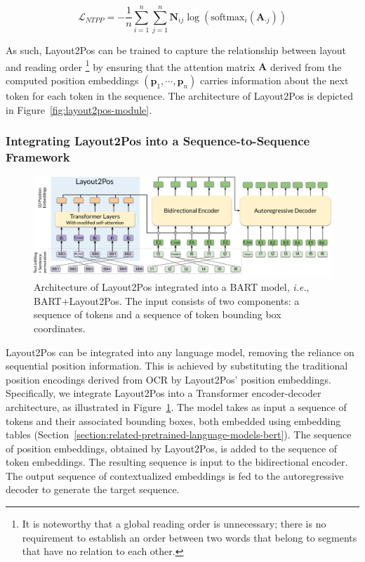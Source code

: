 \begin{equation}
  \mathcal{L}_{NTPP} = - \dfrac{1}{n} \sum_{i=1}^n \sum_{j=1}^n \bm{N}_{ij} \log\left(\textrm{softmax}_i(\bm{A}_{\cdot j})\right)
\end{equation}

\noindent As such, Layout2Pos can be trained to capture the relationship between layout and reading order \footnote{It is noteworthy that a global reading order is unnecessary; there is no requirement to establish an order between two words that belong to segments that have no relation to each other.} by ensuring that the attention matrix $\bm{A}$ derived from the computed position embeddings $(\bm{p}_1, \cdots, \bm{p}_n)$ carries information about the next token for each token in the sequence. The architecture of Layout2Pos is depicted in Figure~\ref{fig:layout2pos-module}. 


\subsubsection{Integrating Layout2Pos into a Sequence-to-Sequence Framework}

\begin{figure}
  \centering
  \includegraphics[width=\textwidth]{images/chapter4/Layout2Pos+BART.pdf}
  \caption{Architecture of Layout2Pos integrated into a BART model, \textit{i.e.}, BART+Layout2Pos. The input consists of two components: a sequence of tokens and a sequence of token bounding box coordinates.}
  \label{fig:layout2pos-ed}
\end{figure}

Layout2Pos can be integrated into any language model, removing the reliance on sequential position information. This is achieved by substituting the traditional position encodings derived from \ac{OCR} by Layout2Pos' position embeddings. Specifically, we integrate Layout2Pos into a Transformer encoder-decoder architecture, as illustrated in Figure~\ref{fig:layout2pos-ed}. The model takes as input a sequence of tokens and their associated bounding boxes, both embedded using embedding tables (Section~\ref{section:related-pretrained-language-models-bert}). The sequence of position embeddings, obtained by Layout2Pos, is added to the sequence of token embeddings. The resulting sequence is input to the bidirectional encoder. The output sequence of contextualized embeddings is fed to the autoregressive decoder to generate the target sequence.



